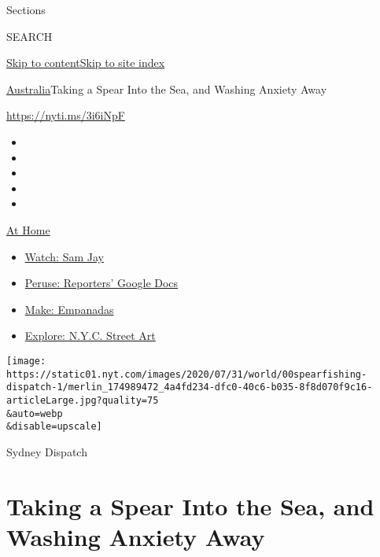 Sections

SEARCH

\protect\hyperlink{site-content}{Skip to
content}\protect\hyperlink{site-index}{Skip to site index}

\href{/section/world/australia}{Australia}\textbar{}Taking a Spear Into
the Sea, and Washing Anxiety Away

\href{https://nyti.ms/3i6iNpF}{https://nyti.ms/3i6iNpF}

\begin{itemize}
\item
\item
\item
\item
\item
\end{itemize}

\href{https://www.nytimes.com/spotlight/at-home?action=click\&pgtype=Article\&state=default\&region=TOP_BANNER\&context=at_home_menu}{At
Home}

\begin{itemize}
\tightlist
\item
  \href{https://www.nytimes.com/2020/08/04/arts/television/sam-jay-netflix-special.html?action=click\&pgtype=Article\&state=default\&region=TOP_BANNER\&context=at_home_menu}{Watch:
  Sam Jay}
\item
  \href{https://www.nytimes.com/interactive/2020/at-home/even-more-reporters-editors-diaries-lists-recommendations.html?action=click\&pgtype=Article\&state=default\&region=TOP_BANNER\&context=at_home_menu}{Peruse:
  Reporters' Google Docs}
\item
  \href{https://www.nytimes.com/2020/08/04/dining/colombian-empanadas-carlos-gaviria.html?action=click\&pgtype=Article\&state=default\&region=TOP_BANNER\&context=at_home_menu}{Make:
  Empanadas}
\item
  \href{https://www.nytimes.com/2020/08/06/arts/design/street-art-nyc-george-floyd.html?action=click\&pgtype=Article\&state=default\&region=TOP_BANNER\&context=at_home_menu}{Explore:
  N.Y.C. Street Art}
\end{itemize}

\texttt{[image: https://static01.nyt.com/images/2020/07/31/world/00spearfishing-dispatch-1/merlin\_174989472\_4a4fd234-dfc0-40c6-b035-8f8d070f9c16-articleLarge.jpg?quality=75\\\&auto=webp\\\&disable=upscale]}

Sydney Dispatch

\hypertarget{taking-a-spear-into-the-sea-and-washing-anxiety-away}{%
\section{Taking a Spear Into the Sea, and Washing Anxiety
Away}\label{taking-a-spear-into-the-sea-and-washing-anxiety-away}}


